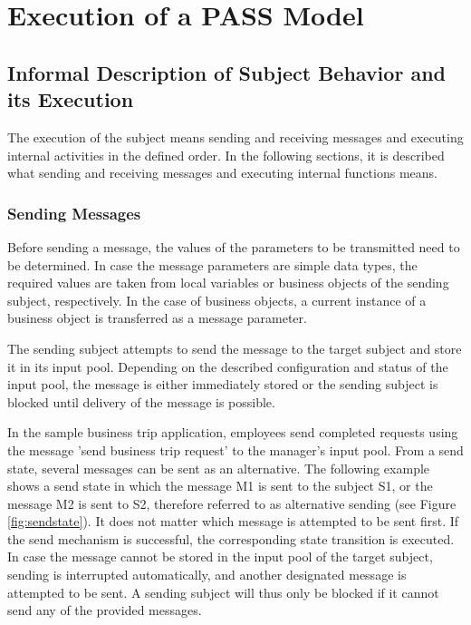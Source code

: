 \chapter{Execution of a PASS Model}
\label{PASSExec}

\section{Informal Description of Subject Behavior and its Execution}

The execution of the subject means sending and receiving messages and executing internal activities in the defined order. In the following sections, it is described what sending and receiving messages and executing internal functions means.

\subsection{Sending Messages}

Before sending a message, the values of the parameters to be transmitted need to be determined. In case the message parameters are simple data types, the required values are taken from local variables or business objects of the sending subject, respectively. In the case of business objects, a current instance of a business object is transferred as a message parameter.

The sending subject attempts to send the message to the target subject and store it in its input pool. Depending on the described configuration and status of the input pool, the message is either immediately stored or the sending subject is blocked until delivery of the message is possible.

In the sample business trip application, employees send completed requests using the message 'send business trip request' to the manager's input pool. From a send state, several messages can be sent as an alternative. The following example shows a send state in which the message M1 is sent to the subject S1, or the message M2 is sent to S2, therefore referred to as alternative sending (see Figure \ref{fig:sendstate}). It does not matter which message is attempted to be sent first. If the send mechanism is successful, the corresponding state transition is executed. In case the message cannot be stored in the input pool of the target subject, sending is interrupted automatically, and another designated message is attempted to be sent. A sending subject will thus only be blocked if it cannot send any of the provided messages.

